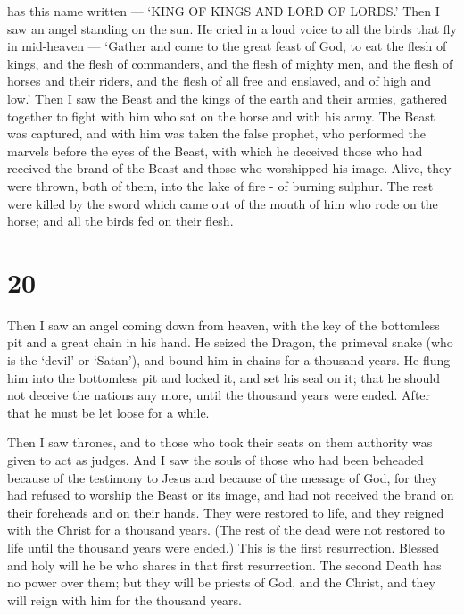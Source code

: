 has this name written --- `KING OF KINGS AND LORD OF LORDS.'
 Then I saw an angel standing on the sun. He cried in a
loud voice to all the birds that fly in mid-heaven --- `Gather and come
to the great feast of God,  to eat the flesh of kings, and
the flesh of commanders, and the flesh of mighty men, and the flesh of
horses and their riders, and the flesh of all free and enslaved, and of
high and low.'  Then I saw the Beast and the kings of the
earth and their armies, gathered together to fight with him who sat on
the horse and with his army.  The Beast was captured, and
with him was taken the false prophet, who performed the marvels before
the eyes of the Beast, with which he deceived those who had received the
brand of the Beast and those who worshipped his image. Alive, they were
thrown, both of them, into the lake of fire - of burning sulphur.
 The rest were killed by the sword which came out of the
mouth of him who rode on the horse; and all the birds fed on their
flesh.

\hypertarget{section-19}{%
\section{20}\label{section-19}}

 Then I saw an angel coming down from heaven, with the key
of the bottomless pit and a great chain in his hand.  He
seized the Dragon, the primeval snake (who is the `devil' or `Satan'),
and bound him in chains for a thousand years.  He flung him
into the bottomless pit and locked it, and set his seal on it; that he
should not deceive the nations any more, until the thousand years were
ended. After that he must be let loose for a while.

 Then I saw thrones, and to those who took their seats on
them authority was given to act as judges. And I saw the souls of those
who had been beheaded because of the testimony to Jesus and because of
the message of God, for they had refused to worship the Beast or its
image, and had not received the brand on their foreheads and on their
hands. They were restored to life, and they reigned with the Christ for
a thousand years.  (The rest of the dead were not restored
to life until the thousand years were ended.) This is the first
resurrection.  Blessed and holy will he be who shares in
that first resurrection. The second Death has no power over them; but
they will be priests of God, and the Christ, and they will reign with
him for the thousand years.

